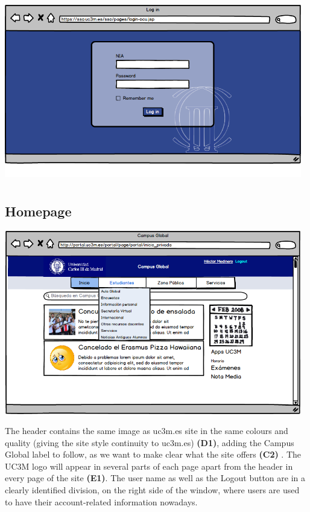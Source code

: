 \documentclass{article}
\begin{document}
\begin{center}
\includegraphics[width=13cm, height=8cm, keepaspectratio]{mockup_login}
\end{center}

\subsection{Homepage}

\begin{center}
\includegraphics[width=13cm, height=8cm, keepaspectratio]{mockup_homepage_top}
\end{center}

The header contains the same image as uc3m.es site in the same colours and quality (giving the site style continuity to uc3m.es) \textbf{(D1)}, adding the Campus Global label to follow, as we want to make clear what the site offers \textbf{(C2)} . The UC3M logo will appear in several parts of each page apart from the header in every page of the site \textbf{(E1)}. The user name as well as the Logout button are in a clearly identified division, on the right side of the window, where users are used to have their account-related information nowadays. 
\end{document}
